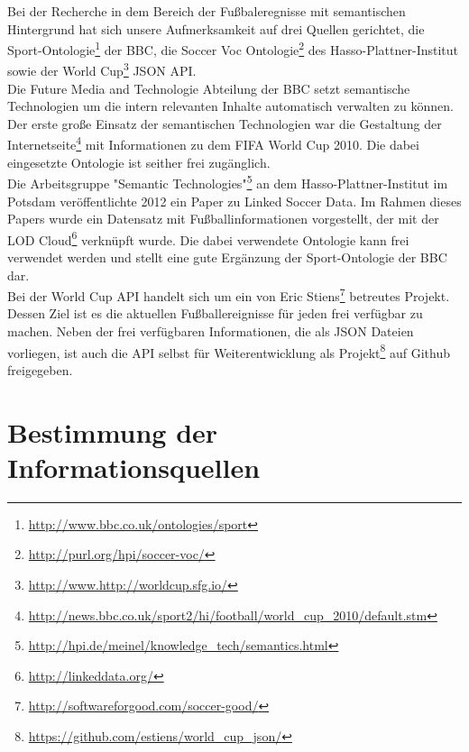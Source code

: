 \documentclass[runningheads,a4paper]{llncs}
\begin{document}
Bei der Recherche in dem Bereich der Fußbaleregnisse mit semantischen Hintergrund hat sich unsere Aufmerksamkeit auf drei Quellen gerichtet, die Sport-Ontologie\footnote{\url{http://www.bbc.co.uk/ontologies/sport}} der BBC, die Soccer Voc Ontologie\footnote{\url{http://purl.org/hpi/soccer-voc/}} des Hasso-Plattner-Institut sowie der World Cup\footnote{\url{http://www.http://worldcup.sfg.io/}} JSON API.\\ Die Future Media and Technologie Abteilung der BBC setzt semantische Technologien um die intern relevanten Inhalte automatisch verwalten zu können. Der erste große Einsatz der semantischen Technologien war die Gestaltung der Internetseite\footnote{\url{http://news.bbc.co.uk/sport2/hi/football/world_cup_2010/default.stm}} mit Informationen zu dem FIFA World Cup 2010. Die dabei eingesetzte Ontologie ist seither frei zugänglich. \\
Die Arbeitsgruppe "Semantic Technologies"\footnote{\url{http://hpi.de/meinel/knowledge_tech/semantics.html}} an dem Hasso-Plattner-Institut im Potsdam veröffentlichte 2012 ein Paper zu Linked Soccer Data\cite{url_lsd}. Im Rahmen dieses Papers wurde ein Datensatz mit Fußballinformationen vorgestellt, der mit der LOD Cloud\footnote{\url{http://linkeddata.org/}} verknüpft wurde. Die dabei verwendete Ontologie kann frei verwendet werden und stellt eine gute Ergänzung der Sport-Ontologie der BBC dar.\\
Bei der World Cup API handelt sich um ein von Eric Stiens\footnote{\url{http://softwareforgood.com/soccer-good/}} betreutes Projekt. Dessen Ziel ist es die aktuellen Fußballereignisse für jeden frei verfügbar zu machen. Neben der frei verfügbaren Informationen, die als JSON Dateien vorliegen, ist auch die API selbst für Weiterentwicklung als Projekt\footnote{\url{https://github.com/estiens/world_cup_json/}} auf Github freigegeben. 

\newpage
\section{Bestimmung der Informationsquellen}\label{infoQuell}
\end{document}
